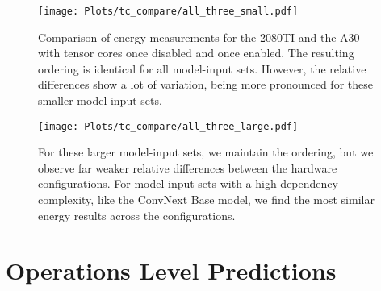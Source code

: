 \begin{figure}
    \center\texttt{[image: Plots/tc\_compare/all\_three\_small.pdf]}
    \caption{Comparison of energy measurements for the 2080TI and the A30 with tensor cores once disabled and once enabled. The resulting ordering is identical for all model-input sets. However, the relative differences show a lot of variation, being more pronounced for these smaller model-input sets.}
    \label{fig:tcnotcsmall}
    \texttt{[image: Plots/tc\_compare/all\_three\_large.pdf]}
    \caption{For these larger model-input sets, we maintain the ordering, but we observe far weaker relative differences between the hardware configurations. For model-input sets with a high dependency complexity, like the ConvNext Base model, we find the most similar energy results across the configurations.}
    \label{fig:tcnotclarge}
\end{figure}

\FloatBarrier


\section{Operations Level Predictions}



